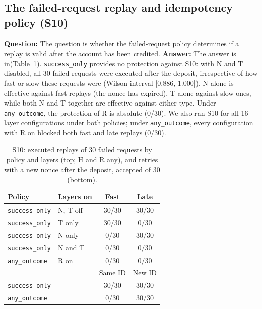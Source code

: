 \documentclass[conference]{IEEEtran}
\newcommand{\so}{\texttt{success\_only}}
\newcommand{\ao}{\texttt{any\_outcome}}
\begin{document}
\subsection{The failed-request replay and idempotency policy (S10)}
\textbf{Question:} The question is whether the failed-request policy determines if a replay is valid after the account has been credited. \textbf{Answer:} The answer is in(Table~\ref{tab:s10}). \so{} provides no protection against S10: with N and T disabled, all 30 failed requests were executed after the deposit, irrespective of how fast or slow these requests were (Wilson interval [0.886, 1.000]). N alone is effective against fast replays (the nonce has expired), T alone against slow ones, while both N and T together are effective against either type. Under \ao{}, the protection of R is absolute (0/30). We also ran S10 for all 16 layer configurations under both policies; under \ao{}, every configuration with R on blocked both fast and late replays (0/30).

\begin{table}[!t]
\caption{S10: executed replays of 30 failed requests by policy and layers (top; H and R any), and retries with a new nonce after the deposit, accepted of 30 (bottom).}
\label{tab:s10}
\centering
\footnotesize
\setlength{\tabcolsep}{4pt}
\begin{tabular}{@{}llcc@{}}
\toprule
Policy & Layers on & Fast & Late \\
\midrule
\so & N, T off & 30/30 & 30/30 \\
\so & T only & 30/30 & 0/30 \\
\so & N only & 0/30 & 30/30 \\
\so & N and T & 0/30 & 0/30 \\
\ao & R on & 0/30 & 0/30 \\
\midrule
 & & Same ID & New ID \\
\midrule
\so & & 30/30 & 30/30 \\
\ao & & 0/30 & 30/30 \\
\bottomrule
\end{tabular}
\end{table}
\end{document}
